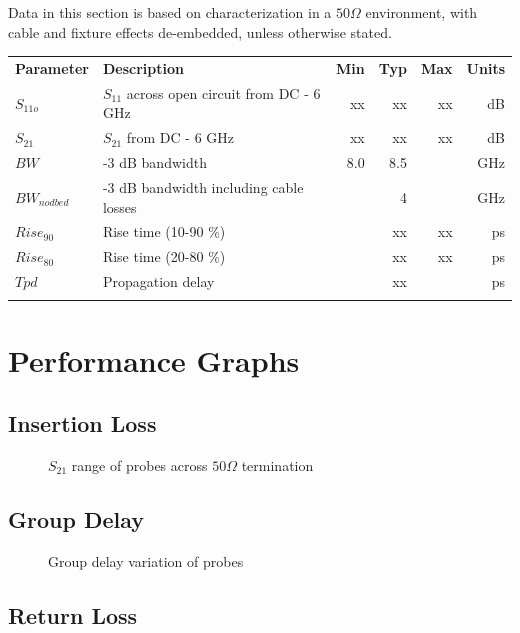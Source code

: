 \documentclass[11pt]{article}
\newcommand{\thinhline}{\Xhline{1\arrayrulewidth}}
\newcommand{\thickhline}{\Xhline{2.5\arrayrulewidth}}
\begin{document}
Data in this section is based on characterization in a $50 \Omega$ environment, with cable and fixture effects
de-embedded, unless otherwise stated.

\begin{tabularx}{16cm}{lXrrrr}
\thickhline
\textbf{Parameter} & \textbf{Description} & \textbf{Min} & \textbf{Typ} & \textbf{Max} & \textbf{Units} \\
\thickhline
$S_{11o}$ & $S_{11}$ across open circuit from DC - 6 GHz & xx & xx & xx & dB \\
\thinhline
$S_{21}$ & $S_{21}$ from DC - 6 GHz & xx & xx & xx & dB \\
\thinhline
$BW$ & -3 dB bandwidth & 8.0 & 8.5 & & GHz \\
\thinhline
$BW_{nodbed}$ & -3 dB bandwidth including cable losses &  & 4 & & GHz \\
\thinhline
$Rise_{90}$ & Rise time (10-90 \%) &  & xx & xx & ps \\
\thinhline
$Rise_{80}$ & Rise time (20-80 \%) &  & xx & xx & ps \\
\thinhline
$Tpd$ & Propagation delay &  & xx &  & ps \\
\thickhline
\end{tabularx}

\pagebreak
\section{Performance Graphs}

\subsection{Insertion Loss}

\begin{figure}[h!]
\centering
\caption{$S_{21}$ range of probes across $50\Omega$ termination}
\label{s21-variation}
\end{figure}

\subsection{Group Delay}

\begin{figure}[h]
\centering
\caption{Group delay variation of probes}
\label{typical-groupdelay}
\end{figure}
\FloatBarrier

\pagebreak
\subsection{Return Loss}
\end{document}
